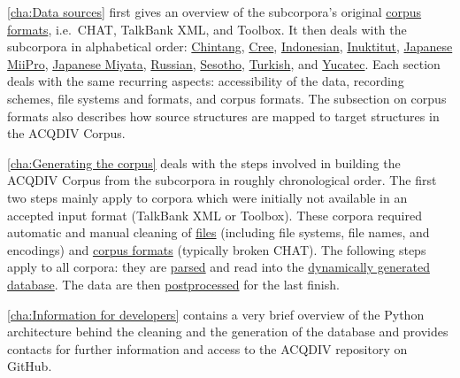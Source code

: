 \documentclass[a4paper, 11pt]{book}
\begin{document}
\autoref{cha:Data sources} first gives an overview of the subcorpora's original \hyperref[sec:Corpus formats]{corpus formats}, i.e.\ CHAT, TalkBank XML, and Toolbox. It then deals with the subcorpora in alphabetical order: \hyperref[sec:Chintang]{Chintang}, \hyperref[sec:Cree]{Cree}, \hyperref[sec:Indonesian]{Indonesian}, \hyperref[sec:Inuktitut]{Inuktitut}, \hyperref[sec:Japanese MiiPro]{Japanese MiiPro}, \hyperref[sec:Japanese Miyata]{Japanese Miyata}, \hyperref[sec:Russian]{Russian}, \hyperref[sec:Sesotho]{Sesotho}, \hyperref[sec:Turkish]{Turkish}, and \hyperref[sec:Yucatec]{Yucatec}. Each section deals with the same recurring aspects: accessibility of the data, recording schemes, file systems and formats, and corpus formats. The subsection on corpus formats also describes how source structures are mapped to target structures in the ACQDIV Corpus. 

\autoref{cha:Generating the corpus} deals with the steps involved in building the ACQDIV Corpus from the subcorpora in roughly chronological order. The first two steps mainly apply to corpora which were initially not available in an accepted input format (TalkBank XML or Toolbox). These corpora required automatic and manual cleaning of \hyperref[sec:Cleaning of file formats]{files} (including file systems, file names, and encodings) and \hyperref[sec:Cleaning of corpus formats]{corpus formats} (typically broken CHAT). The following steps apply to all corpora: they are \hyperref[sec:Parsing the corpus data]{parsed} and read into the \hyperref[sec:Building the database and postprocessing]{dynamically generated database}. The data are then \hyperref[sec:Building the database and postprocessing]{postprocessed} for the last finish. 

\autoref{cha:Information for developers} contains a very brief overview of the Python architecture behind the cleaning and the generation of the database and provides contacts for further information and access to the ACQDIV repository on GitHub. 
\end{document}

